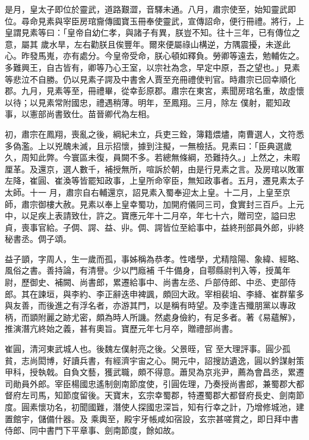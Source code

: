 \begin{pinyinscope}
 是月，皇太子即位於靈武，道路艱澀，音驛未通。八月，肅宗使至，始知靈武即位。尋命見素與宰臣房琯齎傳國寶玉冊奉使靈武，宣傳詔命，便行冊禮。將行，上皇謂見素等曰：「皇帝自幼仁孝，與諸子有異，朕豈不知。往十三年，已有傳位之意，屬其
 歲水旱，左右勸朕且俟豐年。爾來便屬祿山構逆，方隅震擾，未遂此心。昨發馬嵬，亦有處分。今皇帝受命，朕心頓如釋負。勞卿等遠去，勉輔佐之。多難興王，自古皆有，卿等乃心王室，以宗社為念，早定中原，吾之望也。」見素等悲泣不自勝。仍以見素子諤及中書舍人賈至充冊禮使判官。時肅宗已回幸順化郡。九月，見素等至，冊禮畢，從幸彭原郡。肅宗在東宮，素聞房琯名重，故虛懷以待；以見素常附國忠，禮遇稍薄。明年，至鳳翔。三月，除左
 僕射，罷知政事，以憲部尚書致仕。苗晉卿代為左相。



 初，肅宗在鳳翔，喪亂之後，綱紀未立，兵吏三銓，簿籍煨燼，南曹選人，文符悉多偽濫。上以兇醜未滅，且示招懷，據到注擬，一無檢括。見素曰：「臣典選歲久，周知此弊。今寰區未復，員闕不多。若總無條綱，恐難持久。」上然之，未暇厘革。及還京，選人數千，補授無所，喧訴於朝，由是行見素之言。及房琯以敗軍左降，崔圓、崔渙等皆罷知政事，上皇所命宰臣，無知政事者。五月，遷見素太子太師。十一
 月，肅宗自右輔還京，詔見素入蜀奉迎太上皇。十二月，上皇至京師，肅宗御樓大赦。見素以奉上皇幸蜀功，加開府儀同三司，食實封三百戶。上元中，以足疾上表請致仕，許之。寶應元年十二月卒，年七十六，贈司空，謚曰忠貞，喪事官給。子倜、諤、益、丱。倜、諤皆位至給事中，益終刑部員外郎，丱終秘書丞。倜子頌。



 益子顗，字周人，生一歲而孤，事姊稱為恭孝。性嗜學，尤精陰陽、象緯、經略、風俗之書。善持論，有清譽。少以門廕補
 千牛備身，自鄠縣尉判入等，授萬年尉，歷御史、補闕、尚書郎，累遷給事中、尚書左丞、戶部侍郎、中丞、吏部侍郎。其在諫垣，與李約、李正辭迭申裨諷，頗回大政。宰相裴垍、李絳、崔群輩多與友善，而後進之有浮名者，亦游其門，以是稱有時望。及李逢吉殲朋黨以專政柄，而顗附麗之跡尤密，頗為時人所譏。然處身儉約，有足多者。著《易蘊解》，推演潛亢終始之義，甚有奧旨。寶歷元年七月卒，贈禮部尚書。



 崔圓，清河東武城人也。後魏左僕射亮之後。父景晊，官
 至大理評事。圓少孤貧，志尚閎博，好讀兵書，有經濟宇宙之心。開元中，詔搜訪遺逸，圓以鈐謀射策甲科，授執戟。自負文藝，獲武職，頗不得意。蕭炅為京兆尹，薦為會昌丞，累遷司勛員外郎。宰臣楊國忠遙制劍南節度使，引圓佐理，乃奏授尚書郎，兼蜀郡大都督府左司馬，知節度留後。天寶末，玄宗幸蜀郡，特遷蜀郡大都督府長史、劍南節度。圓素懷功名，初聞國難，潛使人探國忠深旨，知有行幸之計，乃增修城池，建置館宇，儲備什器。及
 乘輿至，殿宇牙帳咸如宿設，玄宗甚嗟賞之，即日拜中書侍郎、同中書門下平章事、劍南節度，餘如故。




\end{pinyinscope}
